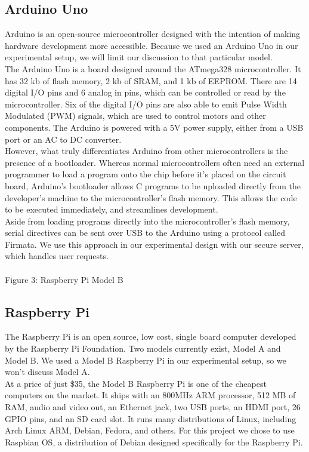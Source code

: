 \documentclass[twoside]{article}
\begin{document}
\begin{multicols}{2}
\subsection{Arduino Uno}
Arduino is an open-source microcontroller designed with the intention of making hardware development more accessible. Because we used an Arduino Uno in our experimental setup, we will limit our discussion to that particular model. \\

The Arduino Uno is a board designed around the ATmega328 microcontroller. It has 32 kb of flash memory, 2 kb of SRAM, and 1 kb of EEPROM. There are 14 digital I/O pins and 6 analog in pins, which can be controlled or read by the microcontroller. Six of the digital I/O pins are also able to emit Pulse Width Modulated (PWM) signals, which are used to control motors and other components. The Arduino is powered with a 5V power supply, either from a USB port or an AC to DC converter. \\

However, what truly differentiates Arduino from other microcontrollers is the presence of a bootloader. Whereas normal microcontrollers often need an external programmer to load a program onto the chip before it’s placed on the circuit board, Arduino’s bootloader allows C programs to be uploaded directly from the developer’s machine to the microcontroller’s flash memory. This allows the code to be executed immediately, and streamlines development. \\

Aside from loading programs directly into the microcontroller’s flash memory, serial directives can be sent over USB to the Arduino using a protocol called Firmata. We use this approach in our experimental design with our secure server, which handles user requests. \\
\\

Figure 3: Raspberry Pi Model B

\subsection{Raspberry Pi}
The Raspberry Pi is an open source, low cost, single board computer developed by the Raspberry Pi Foundation. Two models currently exist, Model A and Model B. We used a Model B Raspberry Pi in our experimental setup, so we won’t discuss Model A. \\
At a price of just \$35, the Model B Raspberry Pi is one of the cheapest computers on the market. It ships with an 800MHz ARM processor, 512 MB of RAM, audio and video out, an Ethernet jack, two USB ports, an HDMI port, 26 GPIO pins, and an SD card slot. It runs many distributions of Linux, including Arch Linux ARM, Debian, Fedora, and others. For this project we chose to use Raspbian OS, a distribution of Debian designed specifically for the Raspberry Pi. \\
\\

\end{multicols}
\end{document}
